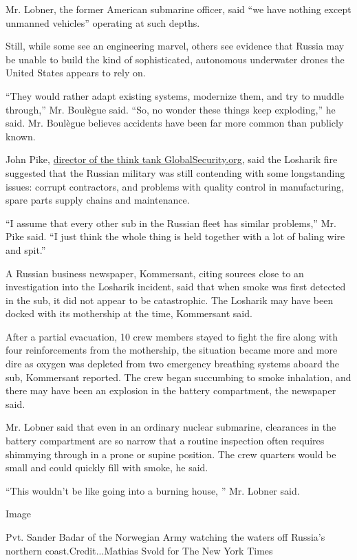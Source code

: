 Mr. Lobner, the former American submarine officer, said ``we have
nothing except unmanned vehicles'' operating at such depths.

Still, while some see an engineering marvel, others see evidence that
Russia may be unable to build the kind of sophisticated, autonomous
underwater drones the United States appears to rely on.

``They would rather adapt existing systems, modernize them, and try to
muddle through,'' Mr. Boulègue said. ``So, no wonder these things keep
exploding,'' he said. Mr. Boulègue believes accidents have been far more
common than publicly known.

John Pike,
\href{https://www.globalsecurity.org/org/staff/pike.htm}{director of the
think tank GlobalSecurity.org}, said the Losharik fire suggested that
the Russian military was still contending with some longstanding issues:
corrupt contractors, and problems with quality control in manufacturing,
spare parts supply chains and maintenance.

``I assume that every other sub in the Russian fleet has similar
problems,'' Mr. Pike said. ``I just think the whole thing is held
together with a lot of baling wire and spit.''

A Russian business newspaper, Kommersant, citing sources close to an
investigation into the Losharik incident, said that when smoke was first
detected in the sub, it did not appear to be catastrophic. The Losharik
may have been docked with its mothership at the time, Kommersant said.

After a partial evacuation, 10 crew members stayed to fight the fire
along with four reinforcements from the mothership, the situation became
more and more dire as oxygen was depleted from two emergency breathing
systems aboard the sub, Kommersant reported. The crew began succumbing
to smoke inhalation, and there may have been an explosion in the battery
compartment, the newspaper said.

Mr. Lobner said that even in an ordinary nuclear submarine, clearances
in the battery compartment are so narrow that a routine inspection often
requires shimmying through in a prone or supine position. The crew
quarters would be small and could quickly fill with smoke, he said.

``This wouldn't be like going into a burning house, '' Mr. Lobner said.

Image

Pvt. Sander Badar of the Norwegian Army watching the waters off Russia's
northern coast.Credit...Mathias Svold for The New York Times

